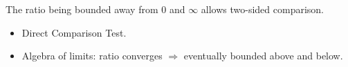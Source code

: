 \begin{remark*}
The ratio being bounded away from 0 and $\infty$ allows two-sided comparison.
\end{remark*}

\begin{remark*}[Dependencies]
\begin{itemize}
  \item Direct Comparison Test.
  \item Algebra of limits: ratio converges $\Rightarrow$ eventually bounded above and below.
\end{itemize}
\end{remark*}
